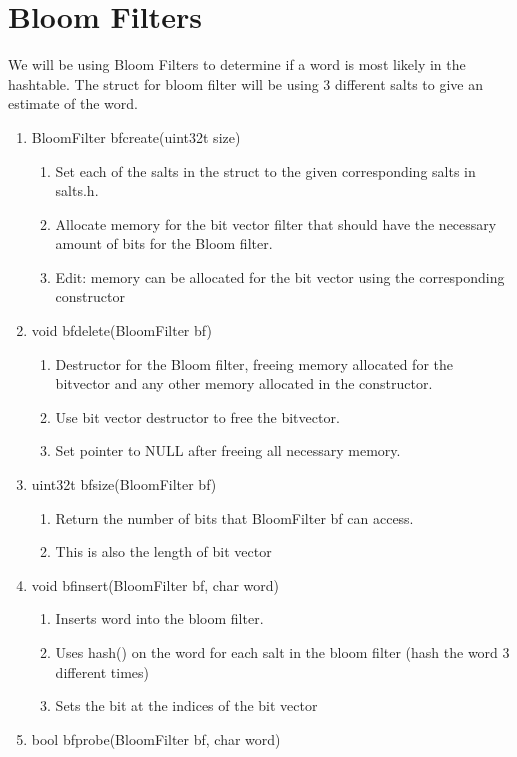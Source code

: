\documentclass[11pt]{article}
\begin{document}
\section{Bloom Filters}\label{ss:bloom}
We will be using Bloom Filters to determine if a word is most likely in the hashtable. The struct for bloom filter will be using 3 different salts to give an estimate of the word.
\begin{enumerate}
\item BloomFilter bfcreate(uint32t size)
	\begin{enumerate}
	\item Set each of the salts in the struct to the given corresponding salts in salts.h.
	\item Allocate memory for the bit vector filter that should have the necessary amount of bits for the Bloom filter.
	\item Edit: memory can be allocated for the bit vector using the corresponding constructor 
	\end{enumerate}
\item void bfdelete(BloomFilter bf)
	\begin{enumerate}
	\item Destructor for the Bloom filter, freeing memory allocated for the bitvector and any other memory allocated in the constructor.
	\item Use bit vector destructor to free the bitvector.
	\item Set pointer to NULL after freeing all necessary memory.
	\end{enumerate}
\item uint32t bfsize(BloomFilter bf)
	\begin{enumerate}
	\item Return the number of bits that BloomFilter bf can access.
	\item This is also the length of bit vector
	\end{enumerate}
\item void bfinsert(BloomFilter bf, char word)
	\begin{enumerate}
	\item Inserts word into the bloom filter.
	\item Uses hash() on the word for each salt in the bloom filter (hash the word 3 different times)
	\item Sets the bit at the indices of the bit vector
	\end{enumerate}
\item bool bfprobe(BloomFilter bf, char word)

\end{enumerate}
\end{document}
